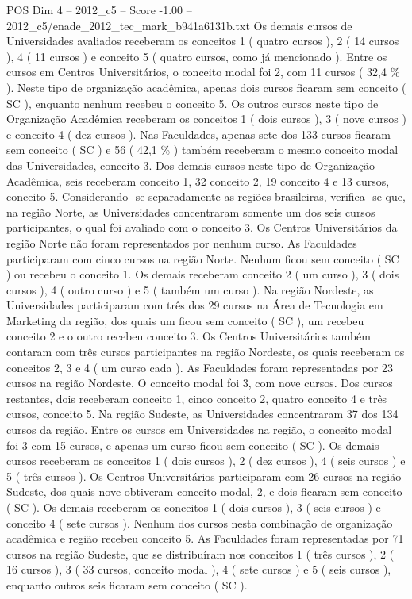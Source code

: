 \begin{textsample}{POS Dim 4 – 2012\_c5 – Score -1.00 – 2012\_c5/enade\_2012\_tec\_mark\_b941a6131b.txt}
Os demais cursos de Universidades avaliados receberam os conceitos 1 ( quatro cursos ), 2 ( 14 cursos ), 4 ( 11 cursos ) e conceito 5 ( quatro cursos, como já mencionado ).
Entre os cursos em Centros Universitários, o conceito modal foi 2, com 11 cursos ( 32,4 \% ).
Neste tipo de organização acadêmica, apenas dois cursos ficaram sem conceito ( SC ), enquanto nenhum recebeu o conceito 5.
Os outros cursos neste tipo de Organização Acadêmica receberam os conceitos 1 ( dois cursos ), 3 ( nove cursos ) e conceito 4 ( dez cursos ).
Nas Faculdades, apenas sete dos 133 cursos ficaram sem conceito ( SC ) e 56 ( 42,1 \% ) também receberam o mesmo conceito modal das Universidades, conceito 3.
Dos demais cursos neste tipo de Organização Acadêmica, seis receberam conceito 1, 32 conceito 2, 19 conceito 4 e 13 cursos, conceito 5.
Considerando -se separadamente as regiões brasileiras, verifica -se que, na região Norte, as Universidades concentraram somente um dos seis cursos participantes, o qual foi avaliado com o conceito 3.
Os Centros Universitários da região Norte não foram representados por nenhum curso.
As Faculdades participaram com cinco cursos na região Norte.
Nenhum ficou sem conceito ( SC ) ou recebeu o conceito 1.
Os demais receberam conceito 2 ( um curso ), 3 ( dois cursos ), 4 ( outro curso ) e 5 ( também um curso ).
Na região Nordeste, as Universidades participaram com três dos 29 cursos na Área de Tecnologia em Marketing da região, dos quais um ficou sem conceito ( SC ), um recebeu conceito 2 e o outro recebeu conceito 3.
Os Centros Universitários também contaram com três cursos participantes na região Nordeste, os quais receberam os conceitos 2, 3 e 4 ( um curso cada ).
As Faculdades foram representadas por 23 cursos na região Nordeste.
O conceito modal foi 3, com nove cursos.
Dos cursos restantes, dois receberam conceito 1, cinco conceito 2, quatro conceito 4 e três cursos, conceito 5.
Na região Sudeste, as Universidades concentraram 37 dos 134 cursos da região.
Entre os cursos em Universidades na região, o conceito modal foi 3 com 15 cursos, e apenas um curso ficou sem conceito ( SC ).
Os demais cursos receberam os conceitos 1 ( dois cursos ), 2 ( dez cursos ), 4 ( seis cursos ) e 5 ( três cursos ).
Os Centros Universitários participaram com 26 cursos na região Sudeste, dos quais nove obtiveram conceito modal, 2, e dois ficaram sem conceito ( SC ).
Os demais receberam os conceitos 1 ( dois cursos ), 3 ( seis cursos ) e conceito 4 ( sete cursos ).
Nenhum dos cursos nesta combinação de organização acadêmica e região recebeu conceito 5.
As Faculdades foram representadas por 71 cursos na região Sudeste, que se distribuíram nos conceitos 1 ( três cursos ), 2 ( 16 cursos ), 3 ( 33 cursos, conceito modal ), 4 ( sete cursos ) e 5 ( seis cursos ), enquanto outros seis ficaram sem conceito ( SC ).

\end{textsample}
